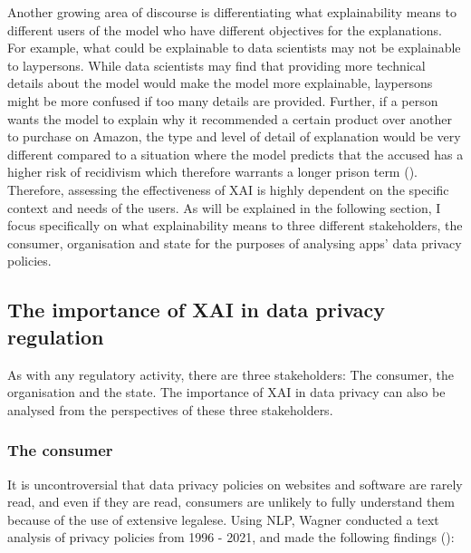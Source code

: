Another growing area of discourse is differentiating what explainability means to different users of the model who have different objectives for the explanations. For example, what could be explainable to data scientists may not be explainable to laypersons. While data scientists may find that providing more technical details about the model would make the model more explainable, laypersons might be more confused if too many details are provided. Further, if a person wants the model to explain why it recommended a certain product over another to purchase on Amazon, the type and level of detail of explanation would be very different compared to a situation where the model predicts that the accused has a higher risk of recidivism which therefore warrants a longer prison term (\cite{rosenfeld2021}). Therefore, assessing the effectiveness of XAI is highly dependent on the specific context and needs of the users. As will be explained in the following section, I focus specifically on what explainability means to three different stakeholders, the consumer, organisation and state for the purposes of analysing apps' data privacy policies.

\subsection{The importance of XAI in data privacy regulation}
As with any regulatory activity, there are three stakeholders: The consumer, the organisation and the state. The importance of XAI in data privacy can also be analysed from the perspectives of these three stakeholders.

\subsubsection{The consumer}
It is uncontroversial that data privacy policies on websites and software are rarely read, and even if they are read, consumers are unlikely to fully understand them because of the use of extensive legalese. Using NLP, Wagner conducted a text analysis of privacy policies from 1996 - 2021, and made the following findings (\cite{wagner2022privacy}): 

